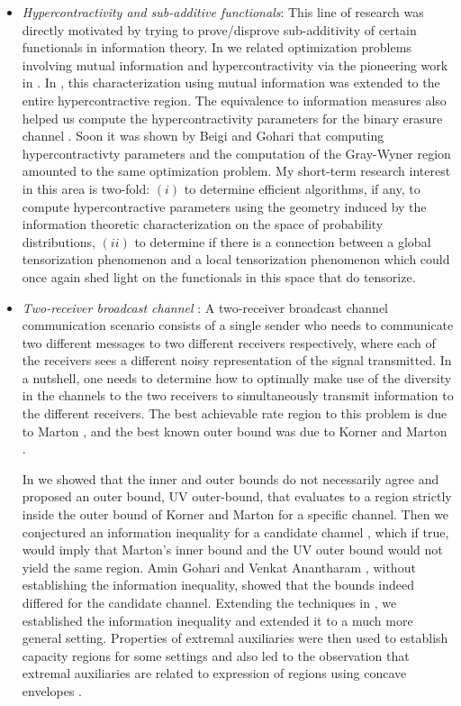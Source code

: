 \documentclass[11pt]{paper} %
\begin{document}
\begin{itemize}
 \renewcommand{\labelitemi}{\scriptsize$\blacksquare$}
 \item {\it Hypercontractivity and sub-additive functionals}: This line of research was directly motivated by trying to prove/disprove sub-additivity of certain functionals in information theory. In \cite{agkn14} we  related optimization problems involving mutual information and hypercontractivity via the pioneering work in \cite{ahg76}. In \cite{nai14b}, this characterization using mutual information was extended to the entire hypercontractive region. The equivalence to information measures also helped us compute the hypercontractivity parameters for the binary erasure channel \cite{naw16,naw17}. Soon it was shown by Beigi and Gohari \cite{beg15} that computing hypercontractivty parameters and the computation of the Gray-Wyner region amounted to the same optimization problem. My short-term research interest in this area is two-fold: $(i)$ to determine efficient algorithms, if any, to compute hypercontractive parameters using the geometry induced by the information theoretic characterization on the space of probability distributions, $(ii)$ to determine if there is a connection between a global tensorization phenomenon and a local tensorization phenomenon which could once again shed light on the functionals in this space that do tensorize.
 
 \item  {\it Two-receiver broadcast channel} : A two-receiver broadcast channel communication scenario consists of a single sender who needs to communicate two  different messages to two different receivers respectively, where each of the receivers sees  a different noisy representation of the signal transmitted. In a nutshell, one needs to determine how to optimally make use of the diversity in the channels to the two receivers to simultaneously transmit information to the different receivers. The best achievable rate region to this problem is due to Marton \cite{mar79}, and the best known outer bound was due to Korner and Marton \cite{mar79}. 
     
      In \cite{nae07} we showed that the inner and outer bounds do not necessarily agree and proposed an outer bound, UV outer-bound, that evaluates to a region strictly inside the outer bound of Korner and Marton \cite{mar79} for a specific channel. Then
      we conjectured an information inequality for a candidate channel \cite{naw08} , which if true, would imply that Marton's inner bound and the UV outer bound would not yield the same region. Amin Gohari and Venkat Anantharam \cite{goa09}, without establishing the information inequality, showed that the bounds indeed differed for the candidate channel. Extending the techniques in \cite{goa09}, we established the information inequality and extended it to a much more general setting\cite{jon09,gjnw13}. Properties of extremal auxiliaries were then used to establish capacity regions for some settings \cite{nai10} and also led to the observation that extremal auxiliaries are related to expression of regions using concave envelopes \cite{nai13}.
     

\end{itemize}
\end{document}
